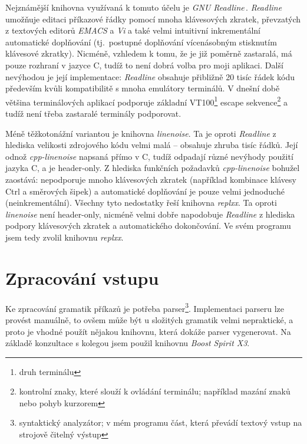 \documentclass[thesis=B,czech,hidelinks]{FITthesis}[2019/03/06]
\newcommand{\Rplus}{\protect\hspace{-.1em}\protect\raisebox{.35ex}{\smaller{\smaller\textbf{+}}}}
\newcommand{\Cpp}{\mbox{C\Rplus\Rplus}\xspace}
\begin{document}
Nejznámější knihovna využívaná k tomuto účelu je \textit{GNU Readline}\,\cite{readline}. \textit{Readline} umožňuje editaci příkazové řádky pomocí mnoha klávesových zkratek, převzatých z textových editorů \textit{EMACS} a \textit{Vi} a také velmi intuitivní inkrementální automatické doplňování (tj.\ postupné doplňování vícenásobným stisknutím klávesové zkratky). Nicméně, vzhledem k tomu, že je již poměrně zastaralá, má pouze rozhraní v jazyce C, tudíž to není dobrá volba pro moji aplikaci. Další nevýhodou je její implementace: \textit{Readline} obsahuje přibližně 20 tisíc řádek kódu především kvůli kompatibilitě s mnoha emulátory terminálů. V dnešní době většina terminálových aplikací podporuje základní VT100\footnote{druh terminálu} escape sekvence\footnote{kontrolní znaky, které slouží k ovládání terminálu; například mazání znaků nebo pohyb kurzorem} a tudíž není třeba zastaralé terminály podporovat.\cite{linenoise-readme}

Méně těžkotonážní variantou je knihovna \textit{linenoise}. Ta je oproti \textit{Readline} z hlediska velikosti zdrojového kódu velmi malá -- obsahuje zhruba tisíc řádků. Její odnož \textit{cpp-linenoise} napsaná přímo v \Cpp{}, tudíž odpadají různé nevýhody použití jazyka C, a je header-only. Z hlediska funkčních požadavků \textit{cpp-linenoise} bohužel zaostává: nepodporuje mnoho klávesových zkratek (například kombinace klávesy Ctrl a směrových šipek) a automatické doplňování je pouze velmi jednoduché (neinkrementální). Všechny tyto nedostatky řeší knihovna \textit{replxx}. Ta oproti \textit{linenoise} není header-only, nicméně velmi dobře napodobuje \textit{Readline} z hlediska podpory klávesových zkratek a automatického dokončování. Ve svém programu jsem tedy zvolil knihovnu \textit{replxx}.


\section{Zpracování vstupu}

Ke zpracování gramatik příkazů je potřeba parser\footnote{syntaktický analyzátor; v mém programu část, která převádí textový vstup na strojově čitelný výstup}. Implementaci parseru lze provést manuálně, to ovšem může být u složitých gramatik velmi nepraktické, a proto je vhodné použít nějakou knihovnu, která dokáže parser vygenerovat. Na základě konzultace s kolegou jsem použil knihovnu \textit{Boost Spirit X3}.
\end{document}
